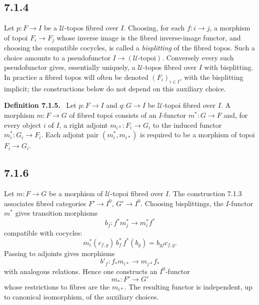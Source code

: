 \documentclass[11pt]{article}
\newcommand{\U}{\mathcal{U}}
\newenvironment{statement}[1]{\par\medskip\noindent\textbf{#1.}\ }{\par\medskip}
\begin{document}
\subsection*{7.1.4}
Let \(p:F\to I\) be a \(\U\)-topos fibred over \(I\). Choosing, for each \(f:i\to j\), a morphism of topoi \(F_i\to F_j\) whose inverse image is the fibred inverse-image functor, and choosing the compatible cocycles, is called a \emph{bisplitting} of the fibred topos. Such a choice amounts to a pseudofunctor \(I\to(\U\text{-topoi})\). Conversely every such pseudofunctor gives, essentially uniquely, a \(\U\)-topos fibred over \(I\) with bisplitting. In practice a fibred topos will often be denoted \((F_i)_{i\in I}\), with the bisplitting implicit; the constructions below do not depend on this auxiliary choice.

\begin{statement}{Definition 7.1.5}
Let \(p:F\to I\) and \(q:G\to I\) be \(\U\)-topoi fibred over \(I\). A morphism \(m:F\to G\) of fibred topoi consists of an \(I\)-functor \(m^*:G\to F\) and, for every object \(i\) of \(I\), a right adjoint \(m_{i*}:F_i\to G_i\) to the induced functor \(m_i^*:G_i\to F_i\). Each adjoint pair \((m_i^*,m_{i*})\) is required to be a morphism of topoi \(F_i\to G_i\).
\end{statement}

\subsection*{7.1.6}
Let \(m:F\to G\) be a morphism of \(\U\)-topoi fibred over \(I\). The construction 7.1.3 associates fibred categories \(F'\to I^0\), \(G'\to I^0\). Choosing bisplittings, the \(I\)-functor \(m^*\) gives transition morphisms
\[
 b_f:f^*m_j^*\to m_i^*f^* \tag{7.1.6.1}
\]
compatible with cocycles:
\[
 m_i^*(c_{f,g})\, b_f^*\, f^*(b_g)=b_{gf}c_{f,g}. \tag{7.1.6.2}
\]
Passing to adjoints gives morphisms
\[
 b'_f:f_*m_{i*}\to m_{j*}f_* \tag{7.1.6.3}
\]
with analogous relations. Hence one constructs an \(I^0\)-functor
\[
 m_*:F'\to G' \tag{7.1.6.4}
\]
whose restrictions to fibres are the \(m_{i*}\). The resulting functor is independent, up to canonical isomorphism, of the auxiliary choices.
\end{document}
